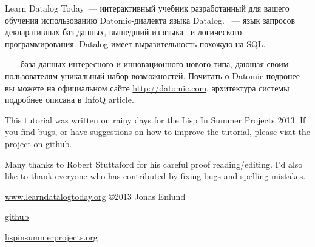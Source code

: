 \secdown


Learn Datalog Today\ --- интерактивный учебник разработанный для вашего обучения
использованию Datomic-диалекта языка Datalog. \ --- язык запросов
декларативных баз данных, вышедший из языка \prolog\ и логического
программирования. Datalog имеет выразительность похожую на SQL.

\ --- база данных интересного и инновационного нового типа, дающая
своим пользователям уникальный набор возможностей. Почитать о Datomic подронее
вы можете на официальном сайте \url{http://datomic.com}, архитектура системы
подробнее описана в
\href{http://www.infoq.com/articles/Architecture-Datomic}{InfoQ article}.

\bigskip
This tutorial was written on rainy days for the Lisp In Summer Projects 2013. If
you find bugs, or have suggestions on how to improve the tutorial, please visit
the project on github.

Many thanks to Robert Stuttaford for his careful proof reading/editing. I'd also
like to thank everyone who has contributed by fixing bugs and spelling mistakes.

\url{www.learndatalogtoday.org} \copyright 2013 Jonas Enlund

\href{https://github.com/jonase/learndatalogtoday}{github}

\url{lispinsummerprojects.org}












\secup %